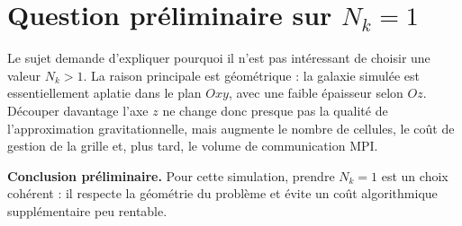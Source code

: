 \section{Question préliminaire sur \texorpdfstring{$N_k = 1$}{Nk = 1}}

Le sujet demande d'expliquer pourquoi il n'est pas intéressant de choisir une valeur \(N_k > 1\). La raison principale est géométrique : la galaxie simulée est essentiellement aplatie dans le plan \(Oxy\), avec une faible épaisseur selon \(Oz\). Découper davantage l'axe \(z\) ne change donc presque pas la qualité de l'approximation gravitationnelle, mais augmente le nombre de cellules, le coût de gestion de la grille et, plus tard, le volume de communication MPI.

\begin{formal}
\textbf{Conclusion préliminaire.}
Pour cette simulation, prendre \(N_k = 1\) est un choix cohérent : il respecte la géométrie du problème et évite un coût algorithmique supplémentaire peu rentable.
\end{formal}
